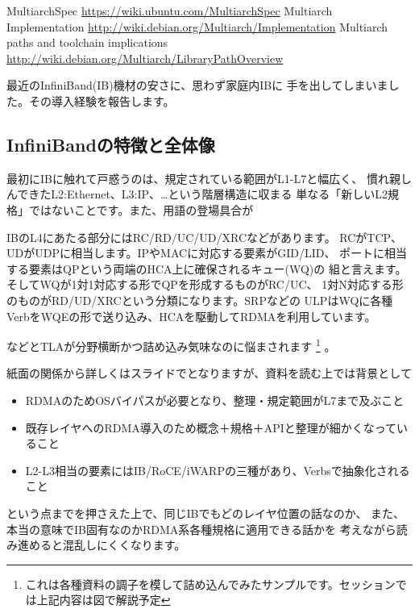 \documentclass[mingoth,a4paper]{jsarticle}
\begin{document}
\begin{thebibliography}{8}
 MultiarchSpec \url{https://wiki.ubuntu.com/MultiarchSpec}
 Multiarch Implementation \url{http://wiki.debian.org/Multiarch/Implementation}
 Multiarch paths and toolchain implications \url{http://wiki.debian.org/Multiarch/LibraryPathOverview}
\end{thebibliography}


\label{sec:ibdebian}

最近のInfiniBand(IB)\cite{IBSPEC}機材の安さに、思わず家庭内IBに
手を出してしまいました。その導入経験を報告します。

\subsection{InfiniBandの特徴と全体像}
最初にIBに触れて戸惑うのは、規定されている範囲がL1-L7と幅広く、
慣れ親しんできたL2:Ethernet、L3:IP、…という階層構造に収まる
単なる「新しいL2規格」ではないことです。また、用語の登場具合が
\begin{screen}
IBのL4にあたる部分にはRC/RD/UC/UD/XRCなどがあります。
RCがTCP、UDがUDPに相当します。IPやMACに対応する要素がGID/LID、
ポートに相当する要素はQPという両端のHCA上に確保されるキュー(WQ)の
組と言えます。そしてWQが1対1対応する形でQPを形成するものがRC/UC、
1対N対応する形のものがRD/UD/XRCという分類になります。SRPなどの
ULPはWQに各種VerbをWQEの形で送り込み、HCAを駆動してRDMAを利用しています。
\end{screen}
などとTLAが分野横断かつ詰め込み気味なのに悩まされます
\footnote{これは各種資料の調子を模して詰め込んでみたサンプルです。セッションでは上記内容は図で解説予定}
。

紙面の関係から詳しくはスライドでとなりますが、資料を読む上では背景として
\begin{itemize}
\item RDMAのためOSバイパスが必要となり、整理・規定範囲がL7まで及ぶこと
\item 既存レイヤへのRDMA導入のため概念＋規格＋APIと整理が細かくなっていること
\item L2-L3相当の要素にはIB/RoCE/iWARPの三種があり、Verbsで抽象化されること
\end{itemize}
という点までを押さえた上で、同じIBでもどのレイヤ位置の話なのか、
また、本当の意味でIB固有なのかRDMA系各種規格に適用できる話かを
考えながら読み進めると混乱しにくくなります。
\end{document}
